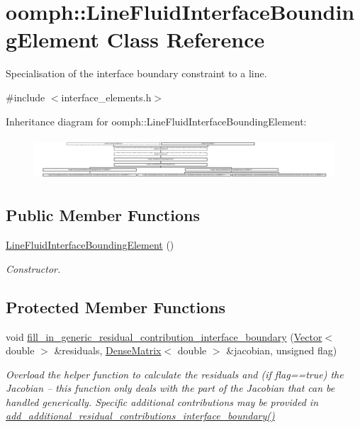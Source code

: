\hypertarget{classoomph_1_1LineFluidInterfaceBoundingElement}{}\section{oomph\+:\+:Line\+Fluid\+Interface\+Bounding\+Element Class Reference}
\label{classoomph_1_1LineFluidInterfaceBoundingElement}


Specialisation of the interface boundary constraint to a line.  




{\ttfamily \#include $<$interface\+\_\+elements.\+h$>$}

Inheritance diagram for oomph\+:\+:Line\+Fluid\+Interface\+Bounding\+Element\+:\begin{figure}[H]
\begin{center}
\leavevmode
\includegraphics[height=1.593496cm]{classoomph_1_1LineFluidInterfaceBoundingElement}
\end{center}
\end{figure}
\subsection*{Public Member Functions}
\begin{DoxyCompactItemize}
\item 
\hyperlink{classoomph_1_1LineFluidInterfaceBoundingElement_a29d14ee44cd9b2db52779ea570850821}{Line\+Fluid\+Interface\+Bounding\+Element} ()
\begin{DoxyCompactList}\small\item\em Constructor. \end{DoxyCompactList}\end{DoxyCompactItemize}
\subsection*{Protected Member Functions}
\begin{DoxyCompactItemize}
\item 
void \hyperlink{classoomph_1_1LineFluidInterfaceBoundingElement_aa162a09ba8dfcba4d81e6abaa7a29986}{fill\+\_\+in\+\_\+generic\+\_\+residual\+\_\+contribution\+\_\+interface\+\_\+boundary} (\hyperlink{classoomph_1_1Vector}{Vector}$<$ double $>$ \&residuals, \hyperlink{classoomph_1_1DenseMatrix}{Dense\+Matrix}$<$ double $>$ \&jacobian, unsigned flag)
\begin{DoxyCompactList}\small\item\em Overload the helper function to calculate the residuals and (if flag==true) the Jacobian -- this function only deals with the part of the Jacobian that can be handled generically. Specific additional contributions may be provided in \hyperlink{classoomph_1_1FluidInterfaceBoundingElement_a4510bd81b572d758694715f673080041}{add\+\_\+additional\+\_\+residual\+\_\+contributions\+\_\+interface\+\_\+boundary()} \end{DoxyCompactList}\end{DoxyCompactItemize}
